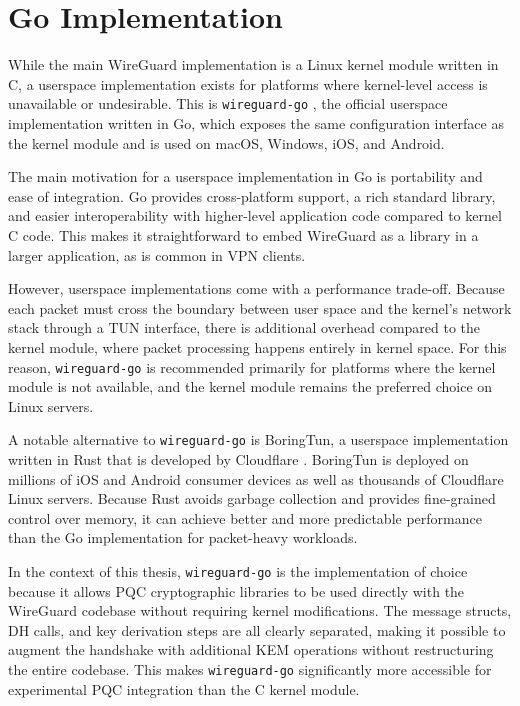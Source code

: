 \section{Go Implementation}\label{sec:wireguard-go}
While the main WireGuard implementation is a Linux kernel module written in C, a userspace implementation exists for platforms where kernel-level access is unavailable or undesirable. This is \texttt{wireguard-go} \cite{wireguardgo}, the official userspace implementation written in Go, which exposes the same configuration interface as the kernel module and is used on macOS, Windows, iOS, and Android.

The main motivation for a userspace implementation in Go is portability and ease of integration. Go provides cross-platform support, a rich standard library, and easier interoperability with higher-level application code compared to kernel C code. This makes it straightforward to embed WireGuard as a library in a larger application, as is common in VPN clients.

However, userspace implementations come with a performance trade-off. Because each packet must cross the boundary between user space and the kernel's network stack through a TUN interface, there is additional overhead compared to the kernel module, where packet processing happens entirely in kernel space. For this reason, \texttt{wireguard-go} is recommended primarily for platforms where the kernel module is not available, and the kernel module remains the preferred choice on Linux servers.

A notable alternative to \texttt{wireguard-go} is BoringTun, a userspace implementation written in Rust that is developed by Cloudflare \cite{CloudflareBoringtun}. BoringTun is deployed on millions of iOS and Android consumer devices as well as thousands of Cloudflare Linux servers.  Because Rust avoids garbage collection and provides fine-grained control over memory, it can achieve better and more predictable performance than the Go implementation for packet-heavy workloads.

In the context of this thesis, \texttt{wireguard-go} is the implementation of choice because it allows PQC cryptographic libraries to be used directly with the WireGuard codebase without requiring kernel modifications. The message structs, DH calls, and key derivation steps are all clearly separated, making it possible to augment the handshake with additional KEM operations without restructuring the entire codebase. This makes \texttt{wireguard-go} significantly more accessible for experimental PQC integration than the C kernel module.


